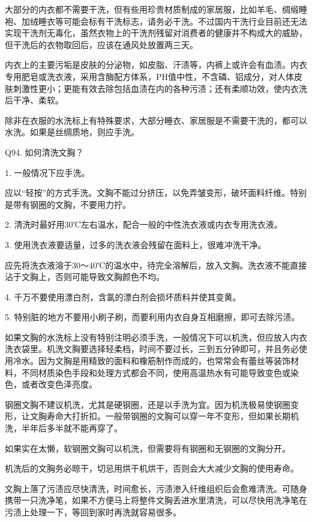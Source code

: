 \documentclass[12pt,UTF8]{ctexbook}
\begin{document}
大部分的内衣都不需要干洗，但有些用珍贵材质制成的家居服，比如羊毛、绸缎睡袍、加绒睡衣等可能会标有干洗标志，请务必干洗。不过国内干洗行业目前还无法实现干洗剂无毒化，虽然衣物上的干洗剂残留对消费者的健康并不构成大的威胁，但干洗后的衣物取回后，应该在通风处放置两三天。


内衣上的主要污垢是皮肤的分泌物，如皮脂、汗渍等，内裤上或许会有血渍。内衣专用肥皂或洗衣液，采用含酶配方体系，PH值中性，不含磷、铝成分，对人体皮肤刺激性更小；更能有效去除包括血渍在内的各种污渍；还有柔顺功效，使内衣洗后干净、柔软。


除非在衣服的水洗标上有特殊要求，大部分睡衣、家居服是不需要干洗的，都可以水洗。如果是丝绸质地，则应手洗。





Q94. 如何清洗文胸？


1. 一般情况下应手洗。

应以“轻按”的方式手洗。文胸不能过分挤压，以免弄皱变形，破坏面料纤维。特别是带有钢圈的文胸，不要用力拧。

2. 清洗时最好用30℃左右温水，配合一般的中性洗衣液或内衣专用洗衣液。

3. 使用洗衣液要适量，过多的洗衣液会残留在面料上，很难冲洗干净。

应先将洗衣液溶于30～40℃的温水中，待完全溶解后，放入文胸。洗衣液不能直接沾于文胸上，否则可能导致文胸颜色不均。

4. 千万不要使用漂白剂，含氯的漂白剂会损坏质料并使其变黄。

5. 特别脏的地方不要用小刷子刷，而要利用内衣自身互相磨擦，即可去除污渍。


如果文胸的水洗标上没有特别注明必须手洗，一般情况下可以机洗，但应放入内衣洗衣袋里。机洗文胸要选择轻柔档，时间不要过长，三到五分钟即可，并且务必使用冷水。因为文胸是用精致的面料和橡筋制作而成的，也常常会有蕾丝等装饰材料，不同材质染色手段和处理方式都会不同，使用高温热水有可能导致变色或染色，或者改变色泽亮度。


钢圈文胸不建议机洗，尤其是硬钢圈，还是以手洗为宜。因为机洗极易使钢圈变形，让文胸寿命大打折扣。一般带钢圈的文胸可以穿一年不变形，但如果长期机洗，半年后多半就不能再穿了。

如果实在太懒，软钢圈文胸可以机洗，但需要将有钢圈和无钢圈的文胸分开。

机洗后的文胸务必晾干，切忌用烘干机烘干，否则会大大减少文胸的使用寿命。


文胸上落了污渍应尽快清洗，时间愈长，污渍渗入纤维组织后会愈难清洗。可随身携带一只洗净笔，如果不方便马上将整件文胸丢进水里清洗，可以尽快用洗净笔在污渍上处理一下，等回到家时再洗就容易很多。
\end{document}
